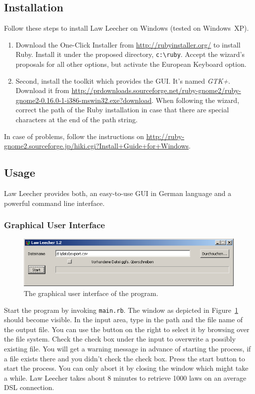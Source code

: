 \documentclass{scrartcl}
\begin{document}
\subsection{Installation}
Follow these steps to install Law Leecher on Windows (tested on Windows~XP).
\begin{enumerate}
\item Download the One-Click Installer from \url{http://rubyinstaller.org/} to install Ruby. Install it under the proposed directory, \texttt{c:\textbackslash ruby}. Accept the wizard's proposals for all other options, but activate the European Keyboard option.

\item Second, install the toolkit which provides the GUI. It's named \textit{GTK+}. Download it from \url{http://prdownloads.sourceforge.net/ruby-gnome2/ruby-gnome2-0.16.0-1-i386-mswin32.exe?download}. When following the wizard, correct the path of the Ruby installation in case that there are special characters at the end of the path string. 
\end{enumerate}

In case of problems, follow the instructions on \url{http://ruby-gnome2.sourceforge.jp/hiki.cgi?Install+Guide+for+Windows}.

\subsection{Usage}
Law Leecher provides both, an easy-to-use GUI in German language and a powerful command line interface.

\subsubsection{Graphical User Interface}
\begin{figure}[ht]
\begin{center}
\includegraphics[width = \textwidth]{GUI.png}
\caption{The graphical user interface of the program.}
\label{fig:guiwindow}
\end{center}
\end{figure}

Start the program by invoking \texttt{main.rb}. The window as depicted in Figure~\ref{fig:guiwindow} should become visible. In the input area, type in the path and the file name of the output file. You can use the button on the right to select it by browsing over the file system. Check the check box under the input to overwrite a possibly existing file. You will get a warning message in advance of starting the process, if a file exists there and you didn't check the check box. Press the start button to start the process. You can only abort it by closing the window which might take a while. Law Leecher takes about 8 minutes to retrieve 1000 laws on an average DSL connection.
\end{document}
